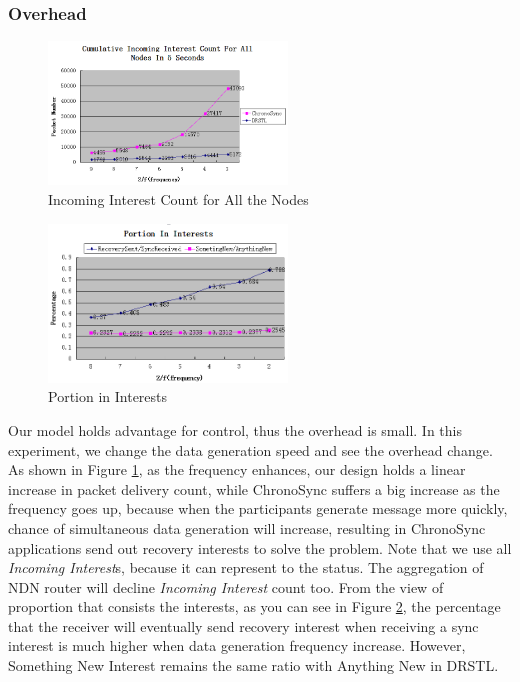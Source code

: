 \documentclass[conference]{IEEEtran}
\begin{document}
\subsubsection{Overhead}
\begin{figure}[!t]
\centering
\includegraphics[width=2.5in]{../png/all-incoming-interest.png}
\caption{Incoming Interest Count for All the Nodes}
\label{overhead}
\end{figure}
\begin{figure}[!t]
\centering
\includegraphics[width=2.5in]{../png/portion-in-interests.png}
\caption{Portion in Interests}
\label{recovery_percentage}
\end{figure}
Our model holds advantage for control,
thus the overhead is small. In this experiment,
we change the data generation speed and see the overhead change.
As shown in Figure \ref{overhead},
as the frequency enhances, our design holds a linear increase in packet delivery count,
while ChronoSync suffers a big increase as the frequency goes up,
because when the participants generate message more quickly,
chance of simultaneous data generation will increase,
resulting in ChronoSync applications send out recovery interests to solve the problem.
Note that we use all \emph{Incoming Interest}s,
because it can represent to the status.
The aggregation of NDN router will decline \emph{Incoming Interest} count too.
From the view of proportion that consists the interests,
as you can see in Figure \ref{recovery_percentage},
the percentage that the receiver will eventually send recovery interest
when receiving a sync interest is much higher when data generation frequency increase.
However, Something New Interest remains the same ratio with Anything New in DRSTL.
\end{document}
